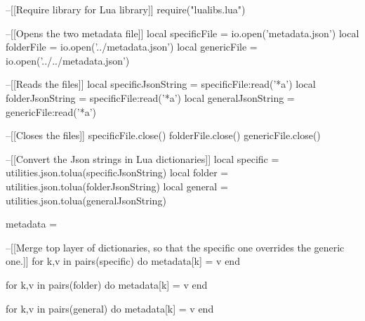 \begin{luacode}
--[[Require library for Lua library]]
require("lualibs.lua")

--[[Opens the two metadata file]]
local specificFile = io.open('metadata.json')
local folderFile = io.open('../metadata.json')
local genericFile = io.open('../../metadata.json')

--[[Reads the files]]
local specificJsonString = specificFile:read('*a')
local folderJsonString = specificFile:read('*a')
local generalJsonString = genericFile:read('*a')

--[[Closes the files]]
specificFile.close()
folderFile.close()
genericFile.close()

--[[Convert the Json strings in Lua dictionaries]]
local specific =  utilities.json.tolua(specificJsonString)
local folder =  utilities.json.tolua(folderJsonString)
local general =  utilities.json.tolua(generalJsonString)

metadata = {}

--[[Merge top layer of dictionaries, so that the specific one overrides the generic one.]]
for k,v in pairs(specific) do
   metadata[k] = v
end

for k,v in pairs(folder) do
   metadata[k] = v
end

for k,v in pairs(general) do
   metadata[k] = v
end
\end{luacode}